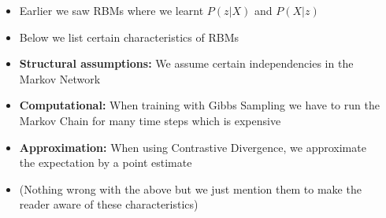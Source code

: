 \begin{frame}
	\begin{columns}
		\begin{overlayarea}{\textwidth}{\textheight}
						
		\end{overlayarea}
		\begin{overlayarea}{\textwidth}{\textheight}
			\begin{itemize}\justifying
				\item<1-> Earlier we saw RBMs where we learnt $P(z|X)$ and $P(X|z)$ 
				\item<2-> Below we list certain characteristics of RBMs
				\item<3-> \textbf{Structural assumptions:} We assume certain independencies in the Markov Network
				\item<4-> \textbf{Computational:} When training with Gibbs Sampling we have to run the Markov Chain for many time steps which is expensive 
				\item<5-> \textbf{Approximation:} When using Contrastive Divergence, we approximate the expectation by a point estimate
				\item<6-> (Nothing wrong with the above but we just mention them to make the reader aware of these characteristics)
			\end{itemize}
		\end{overlayarea}
	\end{columns}
\end{frame}


%			


